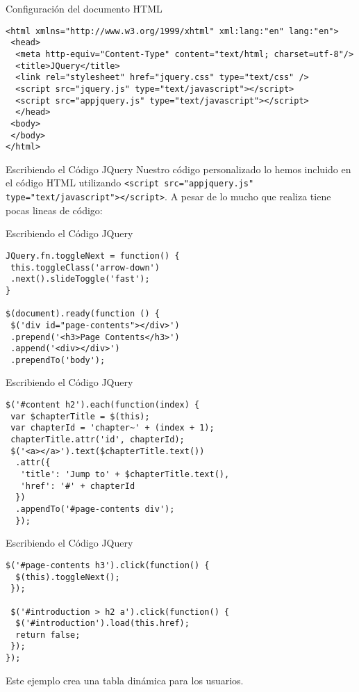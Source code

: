 \begin{frame}[fragile]{Configuración del documento HTML} %
\begin{lstlisting}
<html xmlns="http://www.w3.org/1999/xhtml" xml:lang:"en" lang:"en">
 <head>
  <meta http-equiv="Content-Type" content="text/html; charset=utf-8"/>
  <title>JQuery</title>
  <link rel="stylesheet" href="jquery.css" type="text/css" />
  <script src="jquery.js" type="text/javascript"></script>
  <script src="appjquery.js" type="text/javascript"></script>
  </head>
 <body>
 </body>
</html>
\end{lstlisting}

\end{frame}

\begin{frame}[fragile]{Escribiendo el Código JQuery} %
Nuestro código personalizado lo hemos incluido en el código HTML utilizando
\texttt{<script src="\/appjquery.js" type="text/javascript"\/></script>}. A pesar de lo mucho
que realiza tiene pocas lineas de código:
\end{frame}

\begin{frame}[fragile]{Escribiendo el Código JQuery} %
\begin{lstlisting}
JQuery.fn.toggleNext = function() {
 this.toggleClass('arrow-down')
 .next().slideToggle('fast');
}

$(document).ready(function () {
 $('div id="page-contents"></div>')
 .prepend('<h3>Page Contents</h3>')
 .append('<div></div>')
 .prependTo('body');
\end{lstlisting}
\end{frame}

\begin{frame}[fragile]{Escribiendo el Código JQuery} %
\begin{lstlisting}[firstnumber=last]
 $('#content h2').each(function(index) {
 var $chapterTitle = $(this);
 var chapterId = 'chapter~' + (index + 1);
 chapterTitle.attr('id', chapterId);
 $('<a></a>').text($chapterTitle.text())
  .attr({
   'title': 'Jump to' + $chapterTitle.text(), 
   'href': '#' + chapterId
  })
  .appendTo('#page-contents div');
  });
 \end{lstlisting}
\end{frame}

\begin{frame}[fragile]{Escribiendo el Código JQuery} %
 \begin{lstlisting}[firstnumber=last]
 $('#page-contents h3').click(function() {
  $(this).toggleNext();
 });

 $('#introduction > h2 a').click(function() {
  $('#introduction').load(this.href);
  return false;
 });
});
\end{lstlisting}
Este ejemplo crea una tabla dinámica para los usuarios.
\end{frame}

